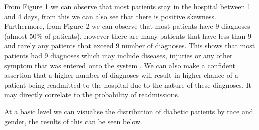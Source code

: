 \documentclass[11pt]{report}
\newcommand{\linespace}{\vspace{0.3cm}\noindent}
\begin{document}
\noindent
From Figure 1 we can observe that most patients stay in the hospital between 1 and 4 days, from this we can also see that there is positive skewness. Furthermore, from Figure 2 we can observe that most patients have 9 diagnoses (almost 50\% of patients), however there are many patients that have less than 9 and rarely any patients that exceed 9 number of diagnoses. This shows that most patients had 9 diagnoses which may include diseases, injuries or any other symptom that was entered onto the system \cite{table2}. We can also make a confident assertion that a higher number of diagnoses will result in higher chance of a patient being readmitted to the hospital due to the nature of these diagnoses. It may directly correlate to the probability of readmissions.

\clearpage
\linespace
At a basic level we can visualise the distribution of diabetic patients by race and gender, the results of this can be seen below.
\end{document}
